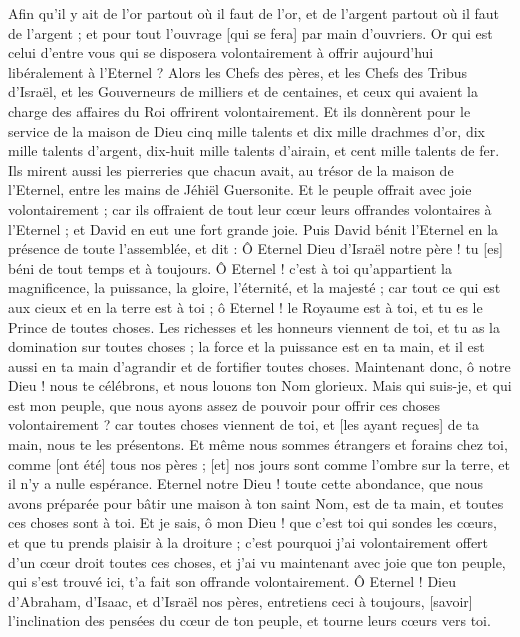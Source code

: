\begin{multicols}{2}
Afin qu'il y ait de l'or partout où il faut de l'or, et de l'argent partout où il faut de l'argent ; et pour tout l'ouvrage [qui se fera] par main d'ouvriers. Or qui est celui d'entre vous qui se disposera volontairement à offrir aujourd'hui libéralement à l'Eternel ?
Alors les Chefs des pères, et les Chefs des Tribus d'Israël, et les Gouverneurs de milliers et de centaines, et ceux qui avaient la charge des affaires du Roi offrirent volontairement.
Et ils donnèrent pour le service de la maison de Dieu cinq mille talents et dix mille drachmes d'or, dix mille talents d'argent, dix-huit mille talents d'airain, et cent mille talents de fer.
Ils mirent aussi les pierreries que chacun avait, au trésor de la maison de l'Eternel, entre les mains de Jéhiël Guersonite.
Et le peuple offrait avec joie volontairement ; car ils offraient de tout leur cœur leurs offrandes volontaires à l'Eternel ; et David en eut une fort grande joie.
Puis David bénit l'Eternel en la présence de toute l'assemblée, et dit : Ô Eternel Dieu d'Israël notre père ! tu [es] béni de tout temps et à toujours.
Ô Eternel ! c'est à toi qu'appartient la magnificence, la puissance, la gloire, l'éternité, et la majesté ; car tout ce qui est aux cieux et en la terre est à toi ; ô Eternel ! le Royaume est à toi, et tu es le Prince de toutes choses.
Les richesses et les honneurs viennent de toi, et tu as la domination sur toutes choses ; la force et la puissance est en ta main, et il est aussi en ta main d'agrandir et de fortifier toutes choses.
Maintenant donc, ô notre Dieu ! nous te célébrons, et nous louons ton Nom glorieux.
Mais qui suis-je, et qui est mon peuple, que nous ayons assez de pouvoir pour offrir ces choses volontairement ? car toutes choses viennent de toi, et [les ayant reçues] de ta main, nous te les présentons.
Et même nous sommes étrangers et forains chez toi, comme [ont été] tous nos pères ; [et] nos jours sont comme l'ombre sur la terre, et il n'y a nulle espérance.
Eternel notre Dieu ! toute cette abondance, que nous avons préparée pour bâtir une maison à ton saint Nom, est de ta main, et toutes ces choses sont à toi.
Et je sais, ô mon Dieu ! que c'est toi qui sondes les cœurs, et que tu prends plaisir à la droiture ; c'est pourquoi j'ai volontairement offert d'un cœur droit toutes ces choses, et j'ai vu maintenant avec joie que ton peuple, qui s'est trouvé ici, t'a fait son offrande volontairement.
Ô Eternel ! Dieu d'Abraham, d'Isaac, et d'Israël nos pères, entretiens ceci à toujours, [savoir] l'inclination des pensées du cœur de ton peuple, et tourne leurs cœurs vers toi.

\end{multicols}
